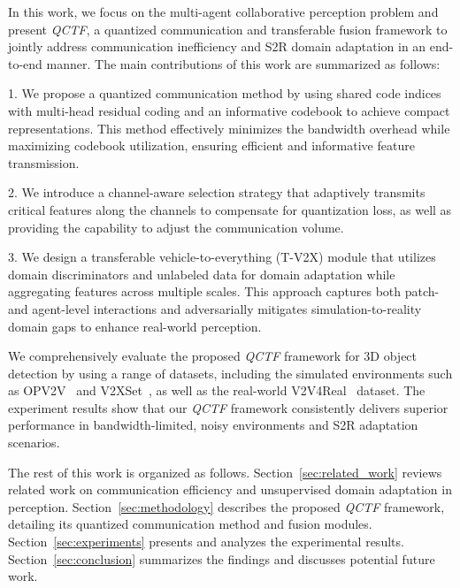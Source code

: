 \documentclass[lettersize,journal]{IEEEtran}
\begin{document}
In this work, we focus on the multi-agent collaborative perception problem and present \emph{QCTF}, a quantized communication and transferable fusion framework to jointly address communication inefficiency and S2R domain adaptation in an end-to-end manner. The main contributions of this work are summarized as follows:

1. We propose a quantized communication method by using shared code indices with multi-head residual coding and an informative codebook to achieve compact representations. This method effectively minimizes the bandwidth overhead while maximizing codebook utilization, ensuring efficient and informative feature transmission.

2. We introduce a channel-aware selection strategy that adaptively transmits critical features along the channels to compensate for quantization loss, as well as providing the capability to adjust the communication volume.

3. We design a transferable vehicle-to-everything (T-V2X) module that utilizes domain discriminators and unlabeled data for domain adaptation while aggregating features across multiple scales. This approach captures both patch- and agent-level interactions and adversarially mitigates simulation-to-reality domain gaps to enhance real-world perception.

We comprehensively evaluate the proposed \emph{QCTF} framework for 3D object detection by using a range of datasets, including the simulated environments such as OPV2V~\cite{opv2v} and V2XSet~\cite{v2x-vit}, as well as the real-world V2V4Real~\cite{v2v4} dataset. %
The experiment results show that our \emph{QCTF} framework consistently delivers superior performance in bandwidth-limited, noisy environments and S2R adaptation scenarios.

The rest of this work is organized as follows. Section~\ref{sec:related_work} reviews related work on communication efficiency and unsupervised domain adaptation in perception. Section~\ref{sec:methodology} describes the proposed \emph{QCTF} framework, detailing its quantized communication method and fusion modules. Section~\ref{sec:experiments} presents and analyzes the experimental results. Section~\ref{sec:conclusion} summarizes the findings and discusses potential future work.
\end{document}
